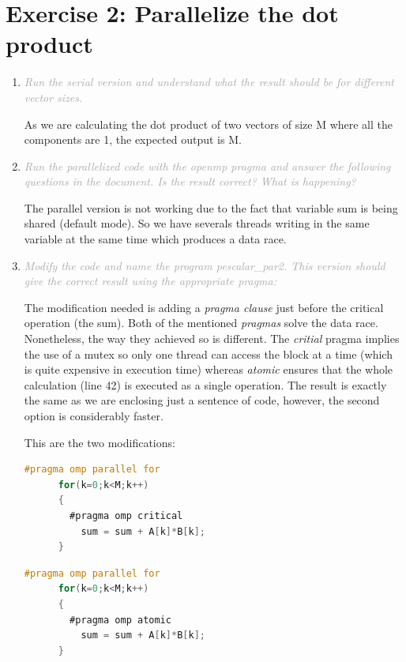 \documentclass{article}
\newcommand{\greyItem}[1]{\item\emph{\textcolor{darkgray}{#1}}}
\begin{document}
\section{Exercise 2: Parallelize the dot product}

\begin{enumerate}[label=2.\arabic*,leftmargin=*]

\greyItem{Run the serial version and understand what the result should be for different vector sizes.} 
    
As we are calculating the dot product of two vectors of size M where all the components are 1, the expected output is M.
    
\greyItem{Run the parallelized code with the openmp pragma and answer the following questions in the document. Is the result correct? What is happening?}
    
The parallel version is not working due to the fact that variable sum is being shared (default mode). So we have severals threads writing in the same variable at the same time which produces a data race.

\greyItem{Modify the code and name the program pescalar\_par2. This version should give the correct result using the appropriate pragma:}

The modification needed is adding a \emph{pragma clause} just before the critical operation (the sum).
Both of the mentioned \emph{pragmas} solve the data race. Nonetheless, the way they achieved so is different. The \emph{critial} pragma implies the use of a mutex so only one thread can access the block at a time (which is quite expensive in execution time) whereas \emph{atomic} ensures that the whole calculation (line 42) is executed as a single operation. The result is exactly the same as we are enclosing just a sentence of code, however, the second option is considerably faster.

This are the two modifications:

\begin{lstlisting}[language=C, texcl=true]
    #pragma omp parallel for 
      for(k=0;k<M;k++)
      {	
        #pragma omp critical
          sum = sum + A[k]*B[k];
      } 
\end{lstlisting}

\begin{lstlisting}[language=C, texcl=true]
    #pragma omp parallel for 
      for(k=0;k<M;k++)
      {	
        #pragma omp atomic
          sum = sum + A[k]*B[k];
      } 
\end{lstlisting}


\end{enumerate}
\end{document}
